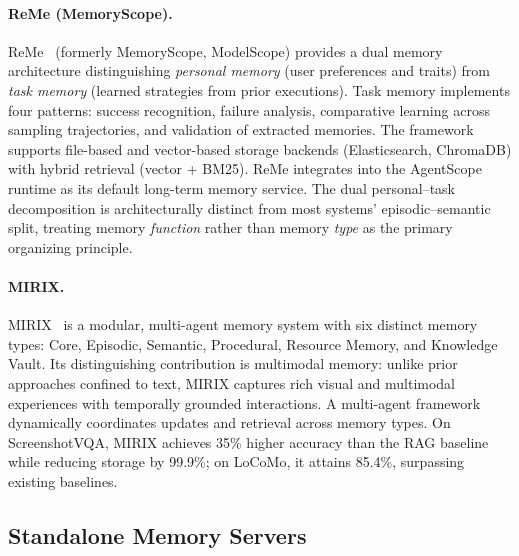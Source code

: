 \paragraph{ReMe (MemoryScope).}
ReMe~\cite{reme2025} (formerly MemoryScope, ModelScope) provides a dual
memory architecture distinguishing \emph{personal memory} (user
preferences and traits) from \emph{task memory} (learned strategies from
prior executions).  Task memory implements four patterns: success
recognition, failure analysis, comparative learning across sampling
trajectories, and validation of extracted memories.  The framework
supports file-based and vector-based storage backends (Elasticsearch,
ChromaDB) with hybrid retrieval (vector + BM25).  ReMe integrates into
the AgentScope runtime as its default long-term memory service.  The
dual personal--task decomposition is architecturally distinct from most
systems' episodic--semantic split, treating memory \emph{function} rather
than memory \emph{type} as the primary organizing principle.

\paragraph{MIRIX.}
MIRIX~\cite{wang2025mirix} is a modular, multi-agent memory system with
six distinct memory types: Core, Episodic, Semantic, Procedural, Resource
Memory, and Knowledge Vault.  Its distinguishing contribution is
multimodal memory: unlike prior approaches confined to text, MIRIX
captures rich visual and multimodal experiences with temporally grounded
interactions.  A multi-agent framework dynamically coordinates updates
and retrieval across memory types.  On ScreenshotVQA, MIRIX achieves
35\% higher accuracy than the RAG baseline while reducing storage by
99.9\%; on LoCoMo, it attains 85.4\%, surpassing existing baselines.

\subsection{Standalone Memory Servers}
\label{sec:standalone}

